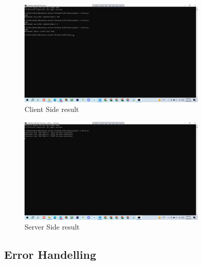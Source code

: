 \documentclass[11pt]{article}
\begin{document}
\begin{itemize}
    \begin{figure}[H]
      \centering
      \includegraphics[width=0.8\textwidth]{atm_result.client.png}
      \caption{Client Side result}
      \label{fig:3}
    \end{figure}
    
    \begin{figure}[H]
      \centering
      \includegraphics[width=0.8\textwidth]{atm_result.server.png}
      \caption{Server Side result}
      \label{fig:4}
    \end{figure}

\end{itemize}



\subsection{Error Handelling}
\end{document}
